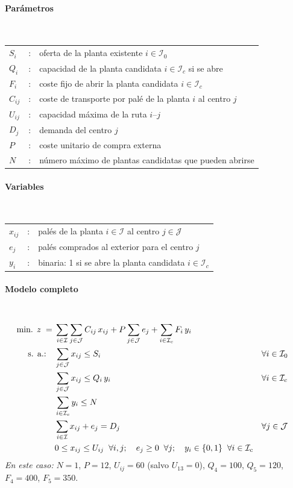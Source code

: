 \paragraph{Parámetros}\mbox{}\\
\begin{tabular}{l c l}
    $S_i$      & : & oferta de la planta existente $i \in \mathcal{I}_0$ \\
    $Q_i$      & : & capacidad de la planta candidata $i \in \mathcal{I}_c$ si se abre \\
    $F_i$      & : & coste fijo de abrir la planta candidata $i \in \mathcal{I}_c$ \\
    $C_{ij}$   & : & coste de transporte por palé de la planta $i$ al centro $j$ \\
    $U_{ij}$   & : & capacidad máxima de la ruta $i$--$j$ \\
    $D_j$      & : & demanda del centro $j$ \\
    $P$        & : & coste unitario de compra externa \\
    $N$        & : & número máximo de plantas candidatas que pueden abrirse \\
\end{tabular}

\paragraph{Variables}\mbox{}\\
\begin{tabular}{l c l}
    $x_{ij}$ & : & palés de la planta $i \in \mathcal{I}$ al centro $j \in \mathcal{J}$ \\
    $e_j$    & : & palés comprados al exterior para el centro $j$ \\
    $y_i$    & : & binaria: 1 si se abre la planta candidata $i \in \mathcal{I}_c$ \\
\end{tabular}

\paragraph{Modelo completo}\mbox{}\\
\begin{align}
\mbox{min. } z \;=\;& \sum_{i \in \mathcal{I}} \sum_{j \in \mathcal{J}} C_{ij}\, x_{ij} + P \sum_{j \in \mathcal{J}} e_j + \sum_{i \in \mathcal{I}_c} F_i\, y_i \notag\\
\mbox{s. a.:}\quad
& \sum_{j \in \mathcal{J}} x_{ij} \leq S_i && \forall i \in \mathcal{I}_0 \notag\\
& \sum_{j \in \mathcal{J}} x_{ij} \leq Q_i\, y_i && \forall i \in \mathcal{I}_c \notag\\
& \sum_{i \in \mathcal{I}_c} y_i \leq N \notag\\
& \sum_{i \in \mathcal{I}} x_{ij} + e_j = D_j && \forall j \in \mathcal{J} \notag\\
& 0 \leq x_{ij} \leq U_{ij} \;\; \forall i,j; \quad e_j \geq 0 \;\; \forall j; \quad y_i \in \{0,1\} \;\; \forall i \in \mathcal{I}_c \notag
\end{align}
\textit{En este caso: } $N=1$, $P=12$, $U_{ij}=60$ (salvo $U_{13}=0$), $Q_{4}=100$, $Q_{5}=120$, $F_4=400$, $F_5=350$.
